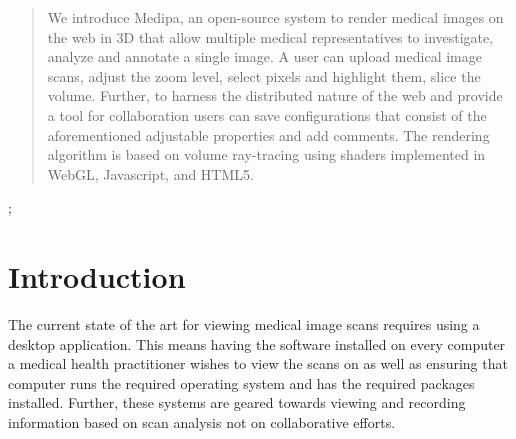 \documentclass[annual]{acmsiggraph}
\begin{document}
\begin{abstract}
We introduce Medipa, an open-source system to render medical images on the web in 3D that allow multiple medical representatives to investigate, analyze and annotate a single image.  A user can  upload medical image scans, adjust the zoom level, select pixels and highlight them, slice the volume.  Further, to harness the distributed nature of the web and provide a tool for collaboration users can save configurations that consist of the aforementioned adjustable properties and add comments. The rendering algorithm is based on volume ray-tracing using shaders implemented in WebGL, Javascript, and HTML5.
\end{abstract}

\begin{CRcatlist}
  ;
\end{CRcatlist}


\keywordlist


\TOGlinkslist


\copyrightspace


\section{Introduction}
The current state of the art for viewing medical image scans requires using a desktop application.  This means having the software installed on every computer a medical health practitioner wishes to view the scans on as well as ensuring that computer runs the required operating system and has the required packages installed.  Further, these systems are geared towards viewing and recording information based on scan analysis not on collaborative efforts.
\end{document}
